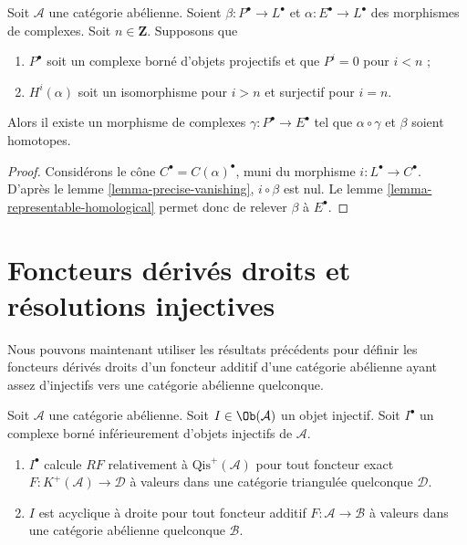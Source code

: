\begin{lemma}
\label{lemma-lift-map}
Soit $\mathcal{A}$ une catégorie abélienne. Soient
$\beta : P^\bullet \to L^\bullet$ et $\alpha : E^\bullet \to L^\bullet$ des
morphismes de complexes. Soit $n \in \mathbf{Z}$. Supposons que
\begin{enumerate}
\item $P^\bullet$ soit un complexe borné d'objets projectifs et que
$P^i = 0$ pour $i < n$ ;
\item $H^i(\alpha)$ soit un isomorphisme pour $i > n$ et surjectif pour
$i = n$.
\end{enumerate}
Alors il existe un morphisme de complexes
$\gamma : P^\bullet \to E^\bullet$ tel que $\alpha \circ \gamma$ et $\beta$
soient homotopes.
\end{lemma}

\begin{proof}
Considérons le cône $C^\bullet = C(\alpha)^\bullet$, muni du morphisme
$i : L^\bullet \to C^\bullet$. D'après le
lemme \ref{lemma-precise-vanishing}, $i \circ \beta$ est nul. Le
lemme \ref{lemma-representable-homological} permet donc de relever $\beta$ à
$E^\bullet$.
\end{proof}
\section{Foncteurs dérivés droits et résolutions injectives}
\label{section-right-derived-functor}

\noindent
Nous pouvons maintenant utiliser les résultats précédents pour définir les
foncteurs dérivés droits d'un foncteur additif d'une catégorie abélienne ayant
assez d'injectifs vers une catégorie abélienne quelconque.

\begin{lemma}
\label{lemma-injective-acyclic}
Soit $\mathcal{A}$ une catégorie abélienne.
Soit $I \in \Ob(\mathcal{A})$ un objet injectif.
Soit $I^\bullet$ un complexe borné inférieurement d'objets injectifs de
$\mathcal{A}$.
\begin{enumerate}
\item $I^\bullet$ calcule $RF$ relativement à
$\text{Qis}^{+}(\mathcal{A})$ pour tout foncteur exact
$F : K^{+}(\mathcal{A}) \to \mathcal{D}$ à valeurs dans une catégorie
triangulée quelconque $\mathcal{D}$.
\item $I$ est acyclique à droite pour tout foncteur additif
$F : \mathcal{A} \to \mathcal{B}$ à valeurs dans une catégorie abélienne
quelconque $\mathcal{B}$.
\end{enumerate}
\end{lemma}

